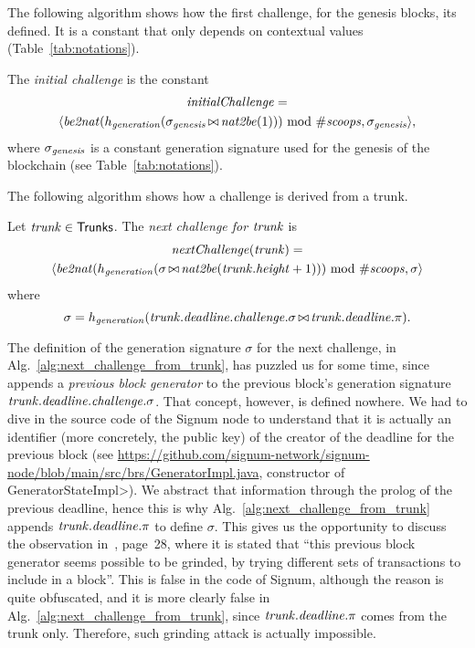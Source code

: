 %
The following algorithm shows how the first challenge, for the genesis blocks,
its defined. It is a constant that only depends on contextual values
(Table~\ref{tab:notations}).
%
\begin{alg}[$\initialchallenge$]\label{alg:initial_challenge}
  The \emph{initial challenge} is the constant
  \begin{multline*}
    {\mathit{initialChallenge}}=\\
    \langle{\mathit{be2nat}}(h_{\mathit{generation}}(\sigma_{\mathit{genesis}}\operatorname*{\bowtie}{\mathit{nat2be}}(1)))\text{ mod }{\#\mathit{scoops}},\sigma_{\mathit{genesis}}\rangle,
  \end{multline*}
  where $\sigma_{\mathit{genesis}}$ is a constant generation signature used for the genesis of the blockchain
  (see Table~\ref{tab:notations}).
\end{alg}
%
The following algorithm shows how a challenge is derived from a trunk.
%
\begin{alg}[$\nextchallenge(\trunk)$]\label{alg:next_challenge_from_trunk}
  Let ${\mathit{trunk}}\in{\mathsf{Trunks}}$. The \emph{next challenge for ${\mathit{trunk}}$} is
  \begin{multline*}
    {\mathit{nextChallenge}}({\mathit{trunk}})=\\
    \langle{\mathit{be2nat}}(h_{\mathit{generation}}(\sigma\operatorname*{\bowtie}{\mathit{nat2be}}({\mathit{trunk}}.{\mathit{height}}+1)))\text{ mod }{\#\mathit{scoops}},\sigma\rangle
  \end{multline*}
  where
  \[
  \sigma=h_{\mathit{generation}}({\mathit{trunk}}.{\mathit{deadline}}.{\mathit{challenge}}.\sigma\operatorname*{\bowtie}{\mathit{trunk}}.{\mathit{deadline}}.\pi).  
  \]
\end{alg}
%
The definition of the generation signature $\sigma$ for the next challenge,
in Alg.~\ref{alg:next_challenge_from_trunk},
has puzzled us for some time, since~\cite{SignumPlotting} appends a \emph{previous block generator}
to the previous block's generation signature ${\mathit{trunk}}.{\mathit{deadline}}.{\mathit{challenge}}.\sigma$.
That concept, however, is defined nowhere.
We had to dive in the source code of the Signum node
to understand that it is actually
an identifier (more concretely, the public key)
of the creator of the deadline for the previous block
(see \url{https://github.com/signum-network/signum-node/blob/main/src/brs/GeneratorImpl.java}, constructor of \<GeneratorStateImpl>).
We abstract that information through the prolog of the previous deadline, hence this is why
Alg.~\ref{alg:next_challenge_from_trunk} appends
${\mathit{trunk}}.{\mathit{deadline}}.\pi$ to define $\sigma$.
This gives us the opportunity to discuss the observation in~\cite{ParkPAFG15}, page~28,
where it is stated that ``this previous block generator seems possible to be grinded, by trying
different sets of transactions to include in a block''. This is false in the code of Signum,
although the reason is quite obfuscated, and it is more clearly false in
Alg.~\ref{alg:next_challenge_from_trunk}, since ${\mathit{trunk}}.{\mathit{deadline}}.\pi$ comes
from the trunk only.
Therefore, such grinding attack is actually impossible.
